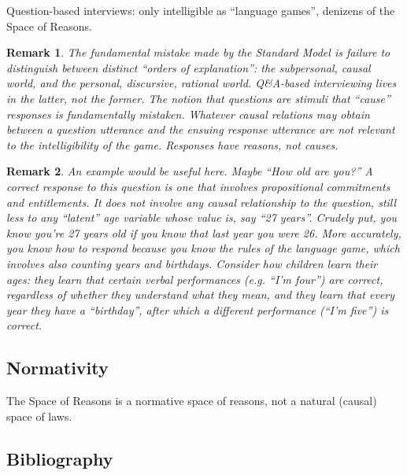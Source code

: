 \documentclass[11pt,twoside]{article}
\newtheorem{remark}{Remark}
\newcommand{\SM}{Standard Model}
\begin{document}
Question-based interviews: only intelligible as ``language games'',
denizens of the Space of Reasons.

\begin{remark}
  The fundamental mistake made by the \SM{} is failure to distinguish
  between distinct ``orders of explanation'': the subpersonal, causal
  world, and the personal, discursive, rational world.  Q\&A-based
  interviewing lives in the latter, not the former.  The notion that
  questions are stimuli that ``cause'' responses is fundamentally
  mistaken.  Whatever causal relations may obtain between a question
  utterance and the ensuing response utterance are not relevant to the
  intelligibility of the game.  Responses have \textit{reasons}, not
  causes.
\end{remark}

\begin{remark}
  An example would be useful here.  Maybe ``How old are you?''  A
  correct response to this question is one that involves propositional
  commitments and entitlements.  It does not involve any causal
  relationship to the question, still less to any ``latent'' age
  variable whose value is, say ``27 years''.  Crudely put, you know
  you're 27 years old if you know that last year you were 26.  More
  accurately, you know \textit{how} to respond because you know the
  rules of the language game, which involves also counting years and
  birthdays.  Consider how children learn their ages: they learn that
  certain verbal performances (e.g. ``I'm four'') are correct,
  regardless of whether they understand what they mean, and they learn
  that every year they have a ``birthday'', after which a different
  performance (``I'm five'') is correct.
\end{remark}

\subsection{Normativity}

The Space of Reasons is a normative space of reasons, not a natural
(causal) space of laws.

\subsection{Bibliography}
\end{document}

